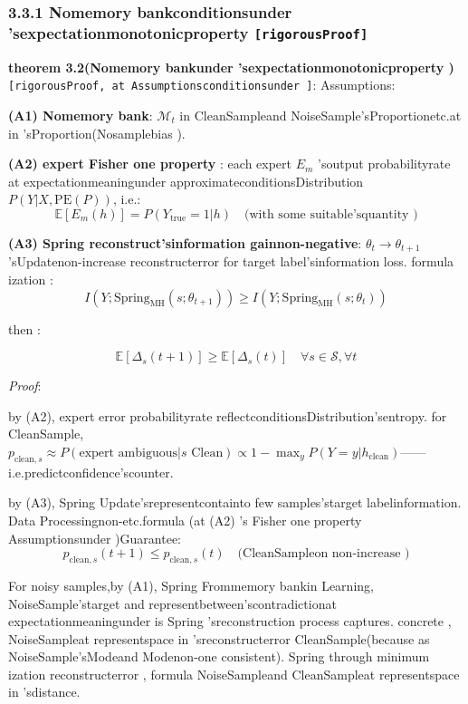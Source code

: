 \documentclass[
  12pt,
]{article}
\begin{document}
\subsubsection{\texorpdfstring{3.3.1 Nomemory bankconditionsunder 'sexpectationmonotonicproperty 
\texttt{{[}rigorousProof{]}}}{3.3.1 Nomemory bankconditionsunder 'sexpectationmonotonicproperty  {[}rigorousProof{]}}}\label{ux65e0ux504fux8bb0ux5fc6ux5e93ux6761ux4ef6ux4e0bux7684ux671fux671bux5355ux8c03ux6027-ux4e25ux683cux8bc1ux660e}

\textbf{theorem  3.2(Nomemory bankunder 'sexpectationmonotonicproperty )}
\texttt{{[}rigorousProof, at Assumptionsconditionsunder {]}}: Assumptions: 

\textbf{(A1) Nomemory bank}: \(\mathcal{M}_t\)
in CleanSampleand NoiseSample'sProportionetc.at in 'sProportion(Nosamplebias ). 

\textbf{(A2) expert  Fisher one property }: each expert  \(E_m\)
'soutput probabilityrate at expectationmeaningunder approximateconditionsDistribution \(P(Y | X, \text{PE}(P))\), i.e.: 
\[\mathbb{E}[E_m(h)] = P(Y_{\text{true}} = 1 | h) \quad \text{(with some suitable'squantity )}\]

\textbf{(A3) Spring reconstruct'sinformation gainnon-negative}: \(\theta_t \to \theta_{t+1}\)
'sUpdatenon-increase reconstructerror for target label'sinformation loss. formula ization : 
\[I(Y; \text{Spring}_{\text{MH}}(s; \theta_{t+1})) \geq I(Y; \text{Spring}_{\text{MH}}(s; \theta_t))\]

then : 

\[\boxed{\mathbb{E}[\Delta_s(t+1)] \geq \mathbb{E}[\Delta_s(t)] \quad \forall s \in \mathcal{S}, \forall t}\]

\emph{Proof}: 

by 
(A2), expert error probabilityrate reflectconditionsDistribution'sentropy. for CleanSample, \(p_{\text{clean},s} \approx P(\text{expert ambiguous} | s \text{ Clean}) \propto 1 - \max_y P(Y=y | h_{\text{clean}})\)------i.e.predictconfidence'scounter. 

by  (A3), Spring Update'srepresentcontainto few samples'starget labelinformation. Data Processingnon-etc.formula (at 
(A2) 's Fisher one property Assumptionsunder )Guarantee: 
\[p_{\text{clean},s}(t+1) \leq p_{\text{clean},s}(t) \quad \text{(CleanSampleon non-increase )}\]

For noisy samples,by  (A1), Spring
Frommemory bankin Learning, NoiseSample'starget and representbetween'scontradictionat expectationmeaningunder is  Spring
'sreconstruction process captures. concrete , NoiseSampleat representspace in 'sreconstructerror CleanSample(because as NoiseSample'sModeand Modenon-one consistent). Spring
through minimum ization reconstructerror , formula NoiseSampleand CleanSampleat representspace in 'sdistance. 
\end{document}
